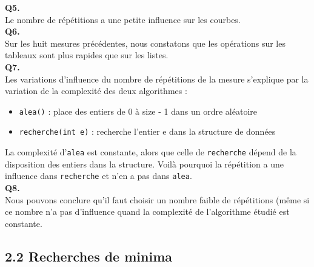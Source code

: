 \textbf{Q5.}
~\\
Le nombre de répétitions a une petite influence sur les courbes.
~\\

\textbf{Q6.}
~\\
Sur les huit mesures précédentes, nous constatons que les opérations sur les tableaux sont plus rapides que sur les listes.
~\\

\textbf{Q7.}
~\\
Les variations d'influence du nombre de répétitions de la mesure s'explique par la variation de la complexité des deux algorithmes :
\begin{itemize}
	\item \verb+alea()+ : place des entiers de 0 à size - 1 dans un ordre aléatoire
	\item \verb+recherche(int e)+ : recherche l'entier e dans la structure de données
\end{itemize}
La complexité d'\verb+alea+ est constante, alors que celle de \verb+recherche+ dépend de la disposition des entiers dans la structure. Voilà pourquoi la répétition a une influence dans \verb+recherche+ et n'en a pas dans \verb+alea+.
~\\

\textbf{Q8.}
~\\
Nous pouvons conclure qu'il faut choisir un nombre faible de répétitions (même si ce nombre n'a pas d'influence quand la complexité de l'algorithme étudié est constante.
~\\

\subsection*{2.2 Recherches de minima}
~\\

